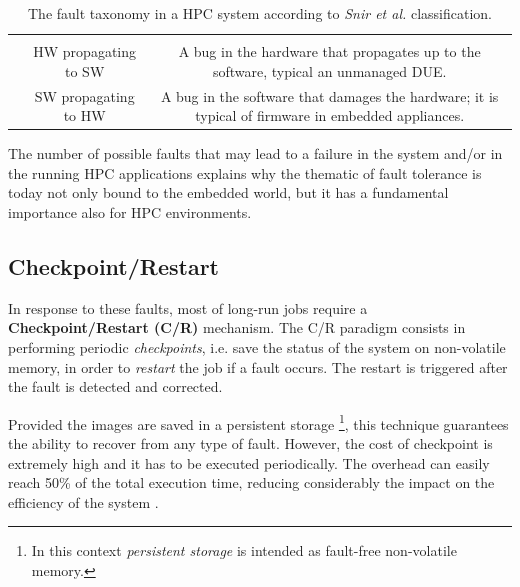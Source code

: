 \begin{table}[ht!b]
\begin{tabular}{ c|c|c}
{ \vspace{.5\baselineskip}}
 \\ \cline{2-3}
 & \centering HW propagating to SW & \parbox{6cm}{\vspace{.5\baselineskip}
 A bug in the hardware that
 propagates up to the software, typical an unmanaged DUE.
 \vspace{.5\baselineskip}}\\ 
 & \centering SW propagating to HW & \parbox{6cm}{\vspace{.5\baselineskip}
 A bug in the software that
 damages the hardware; it is typical of firmware in embedded appliances.
 \vspace{.5\baselineskip}}\\ 

\end{tabular}

\caption[The fault taxonomy in a HPC environments]{The fault taxonomy in a HPC system according to
\emph{Snir et al.} classification.}
\label{tab:faulttaxonomy}

\end{table}


The number of possible faults that may lead to a failure in the system
and/or in the running HPC applications explains why the thematic of fault
tolerance is today not only bound to the embedded world, but it has a
fundamental importance also for HPC environments.

\subsection{Checkpoint/Restart}
In response to these faults, most of long-run jobs require a
\textbf{Checkpoint/Restart (C/R)} mechanism. The C/R paradigm
consists in performing periodic \emph{checkpoints}, i.e. save the
status of the system on non-volatile memory, in order to \emph{restart} the job if a fault occurs. The restart
is triggered after the fault is detected and corrected.

Provided the images are saved in a persistent storage
\footnote{In this context \emph{persistent storage} is intended as fault-free
non-volatile memory.}, this
technique guarantees the ability to recover from any type of fault.
However, the cost of checkpoint is extremely high and it has to be executed
periodically. The overhead can easily reach 50\% of the total execution time,
reducing considerably the impact on the efficiency of the system
\cite{fiala2012detection}.

